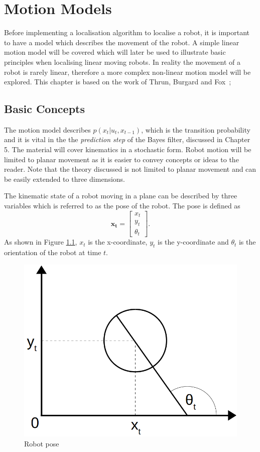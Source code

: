 \documentclass[12pt,oneside,openany,a4paper, %
afrikaans,english,
]{memoir}
\numberwithin{equation}{chapter}
\begin{document}
\chapter{Motion Models}\label{chapMotionModel}
Before implementing a localisation algorithm to localise a robot, it is important to have a model which describes the movement of the robot. A simple linear motion model will be covered which will later be used to illustrate basic principles when localising linear moving robots. In reality the movement of a robot is rarely linear, therefore a more complex non-linear motion model will be explored. This chapter is based on the work of Thrun, Burgard and Fox~\citep{thrun};
\section{Basic Concepts}
The motion model describes $p(x_t|u_t,x_{t-1})$, which is the transition probability and it is vital in the the \textit{prediction step} of the Bayes filter, discussed in Chapter 5. The material will cover kinematics in a stochastic form. Robot motion will be limited to planar movement as it is easier to convey concepts or ideas to the reader. Note that the theory discussed is not limited to planar movement and can be easily extended to three dimensions.

The kinematic state of a robot moving in a plane can be described by three variables which is referred to as the pose of the robot.
The pose is defined as
\begin{equation}
\bm{x_t} =
\begin{bmatrix}
x_t\\
y_t\\
\theta_t
\end{bmatrix}.
\end{equation}
As shown in Figure \ref{fig:pose_robot}, $x_t$ is the x-coordinate, $y_t$ is the y-coordinate and $\theta_t$ is the orientation of the robot at time $t$.

\begin{figure}[H]
  \includegraphics[width=0.4\linewidth]{Figures/pose_robot.png}
  \centering
  \caption{Robot pose}
  \label{fig:pose_robot}
\end{figure}
\end{document}
